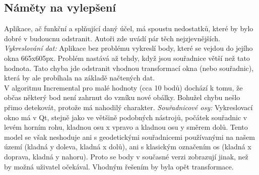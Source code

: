\documentclass{article}
\begin{document}
	\subsection{Náměty na vylepšení} %
	\indent Aplikace, ač funkční a splňující daný účel, má spoustu nedostatků, které by bylo dobré v budoucnu odstranit. Autoři zde uvádí pár těch nejzjevnějších. \\
	\indent \textit{Vykreslování dat:} Aplikace bez problému vykreslí body, které se vejdou do jejího okna 665x605px. Problém nastává až tehdy, když jsou souřadnice větší než tato hodnota. Tato chyba jde odstranit vhodnou transformací okna (nebo souřadnic), která by ale probíhala na základě načtených dat. \\
	\bigskip
	V algoritmu Incremental pro malé hodnoty (cca 10 bodů) dochází k tomu, že občas některý bod není zahrnut do vzníku nové obálky. Bohužel chybu nešlo přimo detekovát, protože má nahodilý charakter.
	\indent \textit{Souřadnicové osy: } Vykreslovací okno má v Qt, stejně jako ve většině podobných nástrojů, počátek souřadnic v levém horním rohu, kladnou osu x vpravo a kladnou osu y směrem dolů. Tento model se však neshoduje ani s geodetickými souřadnicemi používanými na našem území (kladná y doleva, kladná x dolů), ani s klasickým označením os (kladná x doprava, kladná y nahoru). Proto se body v současné verzi zobrazují jinak, než by možná uživatel očekával. Vhodným řešením by byla opět transformace. \\


\pagestyle{empty}

\clearpage

\end{document}
